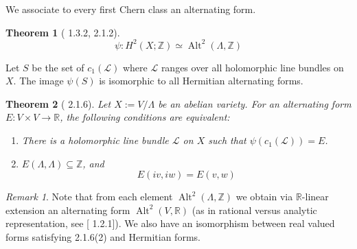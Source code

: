 \documentclass[12pt,reqno]{amsart}
\DeclareMathOperator{\Alt}{Alt}
\newcommand{\Z}{\mathbb{Z}}
\newcommand{\R}{\mathbb{R}}
\newcommand{\mc}{\mathcal}
\newtheorem*{thm*}{Theorem}
\theoremstyle{definition}
\theoremstyle{remark}
\newtheorem*{remark}{Remark}
\newcommand{\ti}{\todo[inline]}
\begin{document}

We associate to every first Chern class an alternating form.

\begin{thm*} [\cite{bl} 1.3.2, 2.1.2] $$\psi: H^2(X; \Z) \simeq \Alt^2(\Lambda, \Z)$$ 
\end{thm*} 




 
 
Let $S$ be the set of $c_1(\mc{L})$ where $\mc{L}$ ranges over all holomorphic line bundles on $X$. The image $\psi(S)$ is isomorphic to all Hermitian alternating forms.




\begin{thm*} [\cite{bl} 2.1.6] Let $X:= V/\Lambda$ be an abelian variety. For an alternating form $E: V \times V \to \R$, the following conditions are equivalent: 

\begin{enumerate} 
\item There is a holomorphic line bundle $\mc{L}$ on $X$ such that $\psi(c_1(\mc{L}))= E$. 
\item $E(\Lambda, \Lambda) \subseteq \Z$, and $$E(iv, iw) = E(v, w)$$
\end{enumerate}
\end{thm*} 

 
\begin{remark} Note that from each element $\Alt^2(\Lambda, \Z)$ we obtain via $\R$-linear extension an alternating form $\Alt^2(V, \R)$ (as in rational versus analytic representation, see [\cite{bl} 1.2.1]). We also have an isomorphism between real valued forms satisfying 2.1.6(2) and Hermitian forms. \end{remark}
\end{document}
